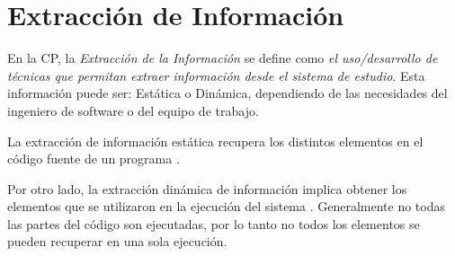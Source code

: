 




\section{Extracción de Información}

En la CP, la \textit{Extracción de la Información} se define como \textit{el uso/desarrollo de técnicas que permitan extraer información desde el sistema de estudio}. 
Esta información puede ser: Estática o Dinámica, dependiendo de las necesidades del 
ingeniero de software o del equipo de trabajo.

La extracción de información estática recupera los distintos elementos en el código fuente de un programa \cite{AHUL06}. 



Por otro lado, la extracción dinámica de información implica obtener los elementos que se utilizaron en la ejecución del sistema \cite{THBE99}. Generalmente no todas las partes del código son ejecutadas, por lo tanto no todos los elementos se pueden recuperar en una sola ejecución.

 
